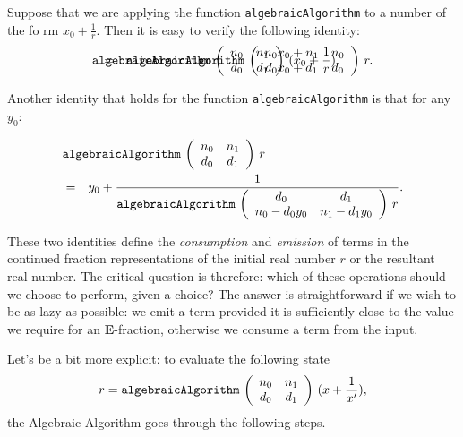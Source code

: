 Suppose that we are applying the function
\mbox{\tt algebraicAlgorithm} to a number of the fo
rm $x_0+\frac{1}{r}$. Then it is
easy to verify the following identity:
\begin{eqnarray*}
\lefteqn{\mbox{\tt algebraicAlgorithm}\indexTT{algebraicAlgorithm}\,
\left(\begin{array}{cc}n_0&n_1\\d_0&d_1\end{array}\right)\,(x_0+\frac{1}{r})} \
\
& = & \mbox{\tt algebraicAlgorithm}\indexTT{algebraicAlgorithm}\,
\left(\begin{array}{cc}n_0x_0+n_1&n_0\\d_0x_0+d_1&d_0\end{array}\right)\,r.
\end{eqnarray*}

Another identity that holds for the function \mbox{\tt algebraicAlgorithm} is that for any
$y_0$:

\begin{eqnarray*}
\lefteqn{
\mbox{\tt algebraicAlgorithm}\indexTT{algebraicAlgorithm}\,\left(\begin{array}{
cc}n_0&n_1\\d_0&d_1\end{array}\right)\,r}\\
&= & y_0 + \frac{1}{\mbox{\tt algebraicAlgorithm}\indexTT{algebraicAlgorithm}\,
\left(\begin{array}{cc}d_0&d_1\\n_0-d_0y_0&n_1-d_1y_0\end{array}\right)\,r }.
\end{eqnarray*}

These two identities define the {\em consumption} and {\em emission}
of terms in the continued fraction representations of the initial real
number $r$ or the resultant real number. The critical question is
therefore: which of these operations should we choose to perform,
given a choice? The answer is straightforward if we wish to be as lazy
as possible: we emit a term provided it is sufficiently close to the
value we require for an {\bf E}-fraction, otherwise we consume a term
from the input.

Let's be a bit more explicit: to evaluate the following state
\[r =\mbox{\tt algebraicAlgorithm}\indexTT{algebraicAlgorithm}\,
\left(\begin{array}{cc}n_0&n_1\\d_0&d_1\end{array}\right)\,(x+\frac{1}{x'}),\]
the Algebraic Algorithm goes through the following steps.

